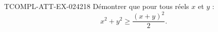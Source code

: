 \begin{exercice}{TCOMPL-ATT-EX-024}{2}{18}
Démontrer que pour tous réels $x$ et $y$ :
\[ x^2 + y^2 \geq \frac{(x+y)^2}{2}. \]

\end{exercice}
